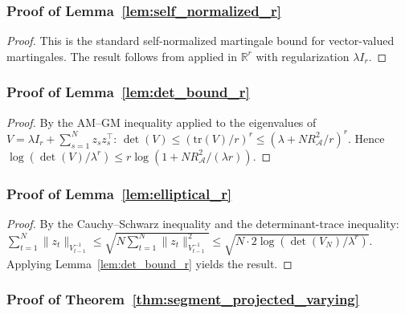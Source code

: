 \documentclass{article}
\newcommand{\R}{\mathbb{R}}
\newcommand{\cA}{\mathcal{A}}
\newcommand{\tr}{\mathrm{tr}}
\begin{document}
\subsubsection{Proof of Lemma~\ref{lem:self_normalized_r}}
\label{proof:self_normalized_r}

\begin{proof}
This is the standard self-normalized martingale bound for vector-valued martingales.
The result follows from \citet[Theorem~1]{abbasi2011improved} applied in $\R^r$ with regularization $\lambda I_r$.
\end{proof}

\subsubsection{Proof of Lemma~\ref{lem:det_bound_r}}
\label{proof:det_bound_r}

\begin{proof}
By the AM--GM inequality applied to the eigenvalues of $V = \lambda I_r + \sum_{s=1}^N z_s z_s^\top$:
$\det(V) \le (\tr(V)/r)^r \le (\lambda + N R_{\cA}^2/r)^r$.
Hence $\log(\det(V)/\lambda^r) \le r\log(1 + N R_{\cA}^2/(\lambda r))$.
\end{proof}

\subsubsection{Proof of Lemma~\ref{lem:elliptical_r}}
\label{proof:elliptical_r}

\begin{proof}
By the Cauchy--Schwarz inequality and the determinant-trace inequality:
$\sum_{t=1}^N \|z_t\|_{V_{t-1}^{-1}} \le \sqrt{N \sum_{t=1}^N \|z_t\|_{V_{t-1}^{-1}}^2} \le \sqrt{N \cdot 2\log(\det(V_N)/\lambda^r)}$.
Applying Lemma~\ref{lem:det_bound_r} yields the result.
\end{proof}

\subsubsection{Proof of Theorem~\ref{thm:segment_projected_varying}}
\label{proof:segment_projected_varying}
\end{document}

